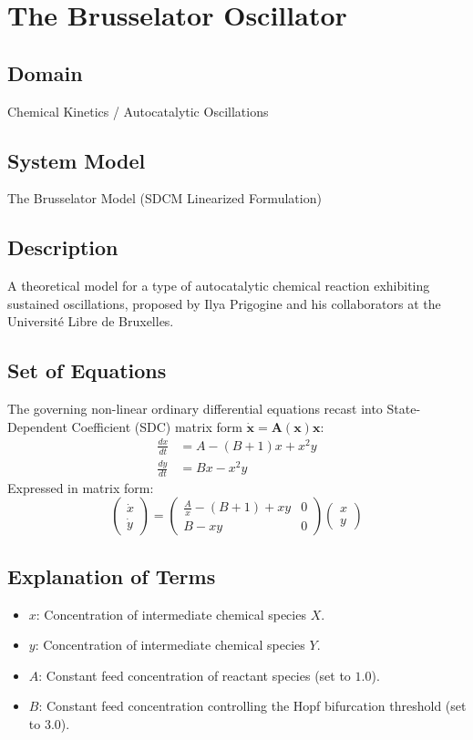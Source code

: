 \chapter{The Brusselator Oscillator}

\section{Domain}
Chemical Kinetics / Autocatalytic Oscillations

\section{System Model}
The Brusselator Model (SDCM Linearized Formulation)

\section{Description}
A theoretical model for a type of autocatalytic chemical reaction exhibiting sustained oscillations, proposed by Ilya Prigogine and his collaborators at the Université Libre de Bruxelles.

\section{Set of Equations}
The governing non-linear ordinary differential equations recast into State-Dependent Coefficient (SDC) matrix form $\dot{\mathbf{x}} = \mathbf{A}(\mathbf{x})\mathbf{x}$:
\begin{align}
\frac{dx}{dt} &= A - (B + 1)x + x^2 y \\
\frac{dy}{dt} &= Bx - x^2 y
\end{align}
Expressed in matrix form:
\begin{equation}
\begin{pmatrix} \dot{x} \\ \dot{y} \end{pmatrix} = \begin{pmatrix} \frac{A}{x} - (B + 1) + xy & 0 \\ B - xy & 0 \end{pmatrix} \begin{pmatrix} x \\ y \end{pmatrix}
\end{equation}

\section{Explanation of Terms}
\begin{itemize}
    \item $x$: Concentration of intermediate chemical species $X$.
    \item $y$: Concentration of intermediate chemical species $Y$.
    \item $A$: Constant feed concentration of reactant species (set to $1.0$).
    \item $B$: Constant feed concentration controlling the Hopf bifurcation threshold (set to $3.0$).
\end{itemize}

